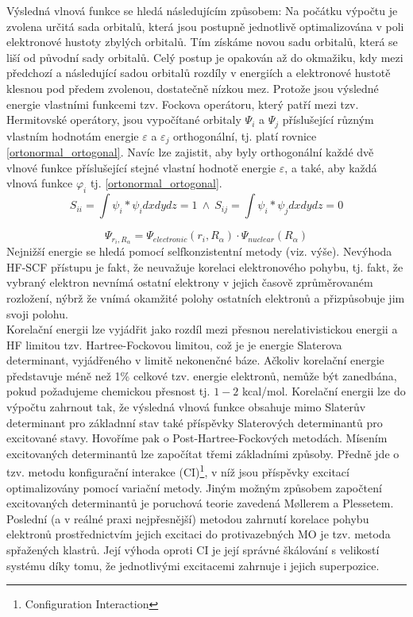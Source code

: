 \documentclass[
  digital, %
  table,   %
  lof,     %
  lot,     %
  oneside,
]{fithesis3}
\begin{document}
Výsledná vlnová funkce se hledá následujícím způsobem: Na počátku výpočtu je zvolena určitá sada orbitalů, která jsou postupně jednotlivě optimalizována v poli elektronové hustoty zbylých orbitalů. Tím získáme novou sadu orbitalů, která se liší od původní sady orbitalů. Celý postup je opakován až do okmažiku, kdy mezi předchozí a následující sadou orbitalů rozdíly v energiích a elektronové hustotě klesnou pod předem zvolenou, dostatečně nízkou mez. Protože jsou výsledné energie vlastními funkcemi tzv. Fockova operátoru, který patří mezi tzv. Hermitovské operátory, jsou vypočítané orbitaly $\Psi_i$ a $\Psi_j$ příslušející různým vlastním hodnotám energie $\varepsilon $ a $\varepsilon_j$ orthogonální, tj. platí rovnice \ref{ortonormal_ortogonal}. Navíc lze zajistit, aby byly orthogonální každé dvě vlnové funkce příslušející stejné vlastní hodnotě energie $\varepsilon $, a také, aby každá vlnová funkce $\varphi_i$ tj. \ref{ortonormal_ortogonal}.
 \begin{equation}
 S_{ii} = \int \psi_i * \psi_i dx dy dz = 1 ~ \wedge ~ S_{ij} = \int \psi_i * \psi_j dx dy dz = 0
 \label{ortonormal_ortogonal}
 \end{equation}

\begin{equation}
  \Psi_{r_i,R_{\alpha}} = \Psi_{electronic}(r_i,R_{\alpha}) \cdot \Psi_{nuclear}(R_{\alpha})
  \label{B_O_approximace}
\end{equation}
Nejnižší energie se hledá pomocí selfkonzistentní metody (viz. výše).
Nevýhoda HF-SCF přístupu je fakt, že neuvažuje korelaci elektronového pohybu, tj. fakt, že vybraný elektron nevnímá ostatní elektrony v jejich časově zprůměrovaném rozložení, nýbrž že vnímá okamžité polohy ostatních elektronů a přizpůsobuje jim svoji polohu. \\

Korelační energii lze vyjádřit jako rozdíl mezi přesnou nerelativistickou energii a HF limitou tzv. Hartree-Fockovou limitou, což je je energie Slaterova determinant, vyjádřeného v limitě nekonenčné báze. Ačkoliv korelační energie představuje méně než 1\% celkové tzv. energie elektronů, nemůže být zanedbána, pokud požadujeme chemickou přesnost tj. $1-2$ kcal/mol.
Korelační energii lze do výpočtu zahrnout tak, že výsledná vlnová funkce obsahuje mimo Slaterův determinant pro základnní stav také příspěvky Slaterových determinantů pro excitované stavy. Hovoříme pak o Post-Hartree-Fockových metodách. Mísením excitovaných determinantů lze započítat třemi základními způsoby. Předně jde o tzv. metodu konfigurační interakce (CI)\footnote{Configuration Interaction}, v níž jsou příspěvky excitací optimalizovány pomocí variační metody. Jiným možným způsobem započtení excitovaných determinantů je poruchová teorie zavedená M{\o}llerem a Plessetem. Poslední (a v reálné praxi nejpřesnější) metodou zahrnutí korelace pohybu elektronů prostřednictvím jejich excitaci do protivazebných MO je tzv. metoda spřažených klastrů. Její výhoda oproti CI je její správné škálování s velikostí systému díky tomu, že jednotlivými excitacemi zahrnuje i jejich superpozice.
\end{document}
